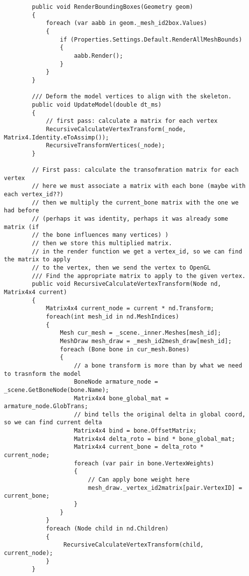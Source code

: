 \begin{scriptsize}
\begin{verbatim}
        public void RenderBoundingBoxes(Geometry geom)
        {
            foreach (var aabb in geom._mesh_id2box.Values)
            {
                if (Properties.Settings.Default.RenderAllMeshBounds)
                {
                    aabb.Render();
                }
            }
        }

        /// Deform the model vertices to align with the skeleton.
        public void UpdateModel(double dt_ms)
        {
            // first pass: calculate a matrix for each vertex
            RecursiveCalculateVertexTransform(_node, Matrix4.Identity.eToAssimp());
            RecursiveTransformVertices(_node);
        }

        // First pass: calculate the transofmration matrix for each vertex
        // here we must associate a matrix with each bone (maybe with each vertex_id??)
        // then we multiply the current_bone matrix with the one we had before 
        // (perhaps it was identity, perhaps it was already some matrix (if 
        // the bone influences many vertices) )
        // then we store this multiplied matrix.
        // in the render function we get a vertex_id, so we can find the matrix to apply 
        // to the vertex, then we send the vertex to OpenGL
        /// Find the appropriate matrix to apply to the given vertex.
        public void RecursiveCalculateVertexTransform(Node nd, Matrix4x4 current)
        {
            Matrix4x4 current_node = current * nd.Transform;
            foreach(int mesh_id in nd.MeshIndices)
            {
                Mesh cur_mesh = _scene._inner.Meshes[mesh_id];
                MeshDraw mesh_draw = _mesh_id2mesh_draw[mesh_id];
                foreach (Bone bone in cur_mesh.Bones)
                {
                    // a bone transform is more than by what we need to trasnform the model
                    BoneNode armature_node = _scene.GetBoneNode(bone.Name);
                    Matrix4x4 bone_global_mat = armature_node.GlobTrans;
                    // bind tells the original delta in global coord, so we can find current delta
                    Matrix4x4 bind = bone.OffsetMatrix;
                    Matrix4x4 delta_roto = bind * bone_global_mat;
                    Matrix4x4 current_bone = delta_roto * current_node;
                    foreach (var pair in bone.VertexWeights)
                    {
                        // Can apply bone weight here
                        mesh_draw._vertex_id2matrix[pair.VertexID] = current_bone;
                    }
                }
            }
            foreach (Node child in nd.Children)
            {
                 RecursiveCalculateVertexTransform(child, current_node);
            }
        }


\end{verbatim}
\end{scriptsize}
